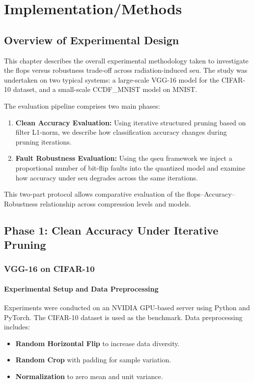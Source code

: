 \chapter{Implementation/Methods}
\label{chap:imp}




\section{Overview of Experimental Design}
This chapter describes the overall experimental methodology taken to investigate the \gls{flops} versus robustness trade-off across radiation-induced \gls{seu}. The study was undertaken on two typical systems: a large-scale VGG-16 model for the CIFAR-10 dataset, and a small-scale CCDF\_MNIST model on MNIST.

The evaluation pipeline comprises two main phases:
\begin{enumerate}
\item \textbf{Clean Accuracy Evaluation:} Using iterative structured pruning based on filter L1-norm, we describe how classification accuracy changes during pruning iterations.
\item \textbf{Fault Robustness Evaluation:} Using the \gls{qseu} framework we inject a proportional number of bit-flip faults into the quantized model and examine how accuracy under \gls{seu} degrades across the same iterations.
\end{enumerate}

This two-part protocol allows comparative evaluation of the \gls{flops}–Accuracy–Robustness relationship across compression levels and models.



\section{Phase 1: Clean Accuracy Under Iterative Pruning}



    \subsection{VGG-16 on CIFAR-10}
        \subsubsection{Experimental Setup and Data Preprocessing}
            Experiments were conducted on an NVIDIA GPU-based server using Python and PyTorch. The CIFAR-10 dataset is used as the benchmark. Data preprocessing includes:
            \begin{itemize}
                \item \textbf{Random Horizontal Flip} to increase data diversity.
                \item \textbf{Random Crop} with padding for sample variation.
                \item \textbf{Normalization} to zero mean and unit variance.
            \end{itemize}
            
